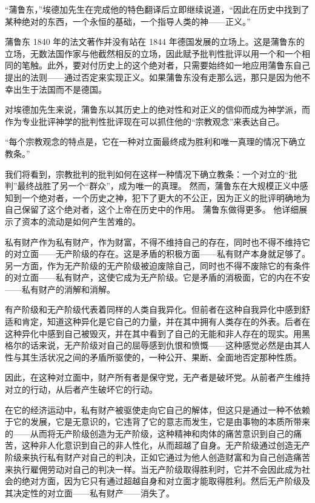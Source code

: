 \documentclass[DIV=12,%
               BCOR=0mm,%
               headinclude=false,%
               footinclude=false,open=any,%
               fontsize=10pt,%
               oneside,%
               paper=210mm:11in]%
               {scrbook}
\begin{document}
“蒲鲁东，”埃德加先生在完成他的特色翻译后立即继续说道，“因此在历史中找到了某种绝对的东西，一个永恒的基础，一个指导人类的神——正义。”


蒲鲁东 1840 年的法文著作并没有站在 1844 年德国发展的立场上。这是蒲鲁东的立场，无数法国作家与他截然相反的立场，因此赋予批判性批评以用一个和一个相同的笔触。此外，要对付历史上的这个绝对者，只需要始终如一地应用蒲鲁东自己提出的法则——通过否定来实现正义。如果蒲鲁东没有走那么远，那只是因为他不幸出生于法国而不是德国。


对埃德加先生来说，蒲鲁东以其历史上的绝对性和对正义的信仰而成为神学派，而作为专业批评神学的批判性批评现在可以抓住他的“宗教观念”来表达自己。


“每个宗教观念的特点是，它在一种对立面最终成为胜利和唯一真理的情况下确立教条。”


我们将看到，宗教批判的批判如何在这样一种情况下确立教条：一个对立的“批判”最终战胜了另一个“群众”，成为唯一的真理。 然而，蒲鲁东在大规模正义中感知到一个绝对者，一个历史之神，犯下了更大的不公正，因为正义的批评明确地为自己保留了这个绝对者，这个上帝在历史中的作用。 蒲鲁东做得更多。 他详细展示了资本的流动是如何产生苦难的。


私有财产作为私有财产，作为财富，不得不维持自己的存在，同时也不得不维持它的对立面——无产阶级的存在。这是矛盾的积极方面——私有财产本身就足够了。另一方面，作为无产阶级的无产阶级被迫废除自己，同时也不得不废除它的有条件的对立面——私有财产，这使它成为无产阶级。它是矛盾的消极面，它的内在不安——私有财产的消解和消解。


有产阶级和无产阶级代表着同样的人类自我异化。但前者在这种自我异化中感到舒适和肯定，知道这种异化是它自己的力量，并在其中拥有人类存在的外表。后者在这种异化中感到自己被毁灭，并在其中看到了自己的无能和非人存在的现实。用黑格尔的话来说，无产阶级对自己的屈辱感到仇恨和愤慨——这种感觉必然是由其人性与其生活状况之间的矛盾所驱使的，一种公开、果断、全面地否定那种性质。


因此，在这种对立面中，财产所有者是保守党，无产者是破坏党。从前者产生维持对立的行动，从后者产生破坏它的行动。


在它的经济运动中，私有财产被驱使走向它自己的解体，但这只是通过一种不依赖于它的发展，它是无意识的，它违背了它的意志而发生，它是由事物的本质所带来的——从而将无产阶级创造为无产阶级，这种精神和肉体的痛苦意识到自己的痛苦，这种非人化意识到自己的非人性化，从而超越了自身。无产阶级通过创造无产阶级来执行私有财产对自己的判决，正如它通过为他人创造财富和为自己创造痛苦来执行雇佣劳动对自己的判决一样。当无产阶级取得胜利时，它并不会因此成为社会的绝对方面，因为它只有通过超越自身和对立面才能取得胜利。然后无产阶级及其决定性的对立面——私有财产——消失了。
\end{document}
